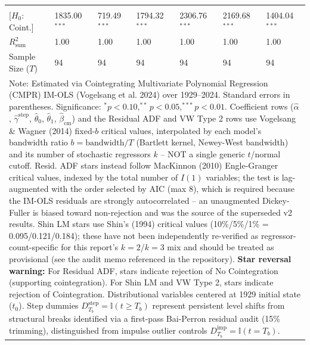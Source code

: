 \begin{table}[H]
\begin{tabular}{p{3.8cm}p{1.35cm}p{1.35cm}p{1.35cm}p{1.35cm}p{1.35cm}p{1.35cm}}
\makecell[l]{VW Type 2 ($S_{\text{Type 2}}$) \\ {\scriptsize [$H_0$: Coint.]}} & 1835.00$^{***}$ & 719.49$^{***}$ & 1794.32$^{***}$ & 2306.76$^{***}$ & 2169.68$^{***}$ & 1404.04$^{***}$  \\
\midrule
$R^2_{\text{sum}}$ & 1.00 & 1.00 & 1.00 & 1.00 & 1.00 & 1.00  \\
Sample Size ($T$) & 94 & 94 & 94 & 94 & 94 & 94  \\
\bottomrule
\multicolumn{7}{p{13.2cm}}{\footnotesize Note: Estimated via Cointegrating Multivariate Polynomial Regression (CMPR) IM-OLS (Vogelsang et al. 2024) over 1929--2024. Standard errors in parentheses. Significance: $^*p<0.10, ^{**}p<0.05, ^{***}p<0.01$. Coefficient rows ($\hat{\alpha}$, $\hat{\gamma}^{\text{step}}$, $\hat{\theta}_0$, $\hat{\theta}_1$, $\hat{\beta}_{\text{cm}}$) and the Residual ADF and VW Type 2 rows use Vogelsang \& Wagner (2014) fixed-$b$ critical values, interpolated by each model's bandwidth ratio $b=\text{bandwidth}/T$ (Bartlett kernel, Newey-West bandwidth) and its number of stochastic regressors $k$ -- NOT a single generic $t$/normal cutoff. Resid. ADF stars instead follow MacKinnon (2010) Engle-Granger critical values, indexed by the total number of $I(1)$ variables; the test is lag-augmented with the order selected by AIC (max 8), which is required because the IM-OLS residuals are strongly autocorrelated -- an unaugmented Dickey-Fuller is biased toward non-rejection and was the source of the superseded v2 results. Shin LM stars use Shin's (1994) critical values (10\%/5\%/1\% = 0.095/0.121/0.184); these have not been independently re-verified as regressor-count-specific for this report's $k=2$/$k=3$ mix and should be treated as provisional (see the audit memo referenced in the repository). \textbf{Star reversal warning:} For Residual ADF, stars indicate rejection of No Cointegration (supporting cointegration). For Shin LM and VW Type 2, stars indicate rejection of Cointegration. Distributional variables centered at 1929 initial state ($t_0$). Step dummies $D^{\text{step}}_{T_b} = \mathbb{I}(t \ge T_b)$ represent persistent level shifts from structural breaks identified via a first-pass Bai-Perron residual audit (15\% trimming), distinguished from impulse outlier controls $D^{\text{imp}}_{T_b} = \mathbb{I}(t = T_b)$.}
\end{tabular}
\end{table}
